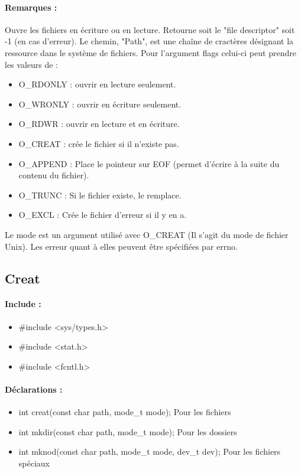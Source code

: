 \documentclass{article}[12pt]
\begin{document}
\paragraph{Remarques : }
Ouvre les fichiers en écriture ou en lecture. Retourne soit le "file descriptor" soit -1 (en cas d'erreur). Le chemin, "Path", est une chaîne de cractères désignant la ressource dans le système de fichiers. Pour l'argument flags celui-ci peut prendre les valeurs de :
\begin{itemize}
	\item O\_RDONLY : ouvrir en lecture seulement.
	\item O\_WRONLY : ouvrir en écriture seulement.
	\item O\_RDWR : ouvrir en lecture et en écriture.
	\item O\_CREAT : crée le fichier si il n'existe pas.
	\item O\_APPEND : Place le pointeur sur EOF (permet d'écrire à la suite du contenu du fichier).
	\item O\_TRUNC : Si le fichier existe, le remplace.
	\item O\_EXCL : Crée le fichier d'erreur si il y en a.
\end{itemize}
Le mode est un argument utilisé avec O\_CREAT (Il s'agit du mode de fichier Unix). Les erreur quant à elles peuvent être spécifiées par errno.
\subsection{Creat}
\paragraph{Include : }
\begin{itemize}
	\item \#include <sys/types.h>
	\item \#include <stat.h>
	\item \#include <fcntl.h>
\end{itemize}
\paragraph{Déclarations : }
\begin{itemize}
	\item int creat(const char \* path, mode\_t mode); Pour les fichiers
	\item int mkdir(const char \* path, mode\_t mode); Pour les dossiers
	\item int mknod(const char \* path, mode\_t mode, dev\_t dev); Pour les fichiers spéciaux
\end{itemize}
\end{document}
